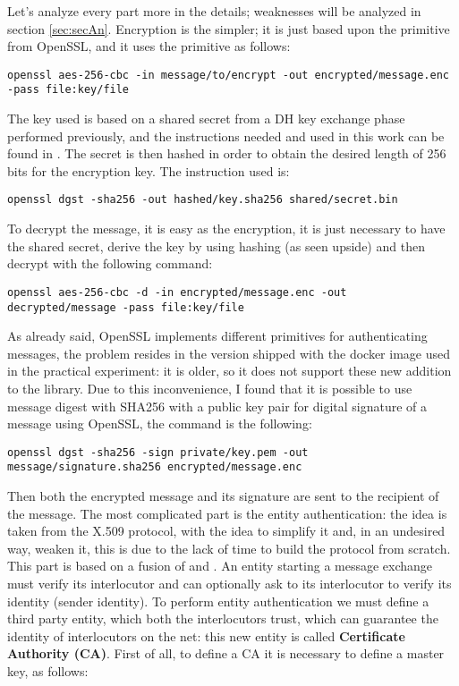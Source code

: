 \documentclass{article}
\begin{document}
Let's analyze every part more in the details; weaknesses will be analyzed in section \ref{sec:secAn}.\newline
Encryption is the simpler; it is just based upon the primitive from OpenSSL, and it uses the primitive as follows: 

\begin{lstlisting}[breaklines]
	openssl aes-256-cbc -in message/to/encrypt -out encrypted/message.enc -pass file:key/file
\end{lstlisting}

The key used is based on a shared secret from a DH key exchange phase performed previously, and the instructions needed and used in this work can be found in \cite{DHKE}. The secret is then hashed in order to obtain the desired length of 256 bits for the encryption key. The instruction used is:

\begin{lstlisting}[breaklines]
	openssl dgst -sha256 -out hashed/key.sha256 shared/secret.bin
\end{lstlisting}

To decrypt the message, it is easy as the encryption, it is just necessary to have the shared secret, derive the key by using hashing (as seen upside) and then decrypt with the following command:

\begin{lstlisting}[breaklines]
	openssl aes-256-cbc -d -in encrypted/message.enc -out decrypted/message -pass file:key/file
\end{lstlisting}

As already said, OpenSSL implements different primitives for authenticating messages, the problem resides in the version shipped with the docker image used in the practical experiment: it is older, so it does not support these new addition to the library. Due to this inconvenience, I found \cite{signatures} that it is possible to use message digest with SHA256 with a public key pair for digital signature of a message using OpenSSL, the command is the following:

\begin{lstlisting}[breaklines]
	openssl dgst -sha256 -sign private/key.pem -out message/signature.sha256 encrypted/message.enc
\end{lstlisting}

Then both the encrypted message and its signature are sent to the recipient of the message. \newline
The most complicated part is the entity authentication: the idea is taken from the X.509 protocol, with the idea to simplify it and, in an undesired way, weaken it, this is due to the lack of time to build the protocol from scratch. This part is based on a fusion of \cite{certificates1} and \cite{certificates2}. An entity starting a message exchange must verify its interlocutor and can optionally ask to its interlocutor to verify its identity (sender identity). To perform entity authentication we must define a third party entity, which both the interlocutors trust, which can guarantee the identity of interlocutors on the net: this new entity is called \textbf{Certificate Authority (CA)}. First of all, to define a CA it is necessary to define a master key, as follows: 
\end{document}
